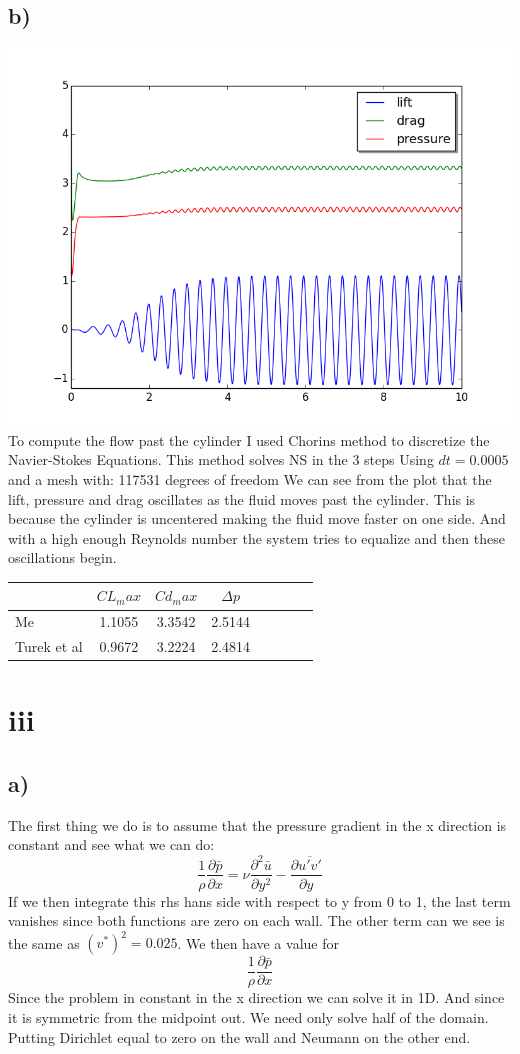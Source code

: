 \documentclass[a4paper,norsk]{article}
\begin{document}
\subsection*{b)}
\includegraphics[trim = 0mm 0mm 0mm 0mm, clip, scale=0.4]{lift_drag_pressure_plot.png} 
\newline
To compute the flow past the cylinder I used Chorins method to discretize the Navier-Stokes Equations. This method solves NS in the 3 steps
Using $dt = 0.0005 $ and a mesh with:  117531 degrees of freedom
We can see from the plot that the lift, pressure and drag oscillates as the fluid moves past the cylinder. This is because the cylinder is uncentered making the fluid move faster on one side. And with a high enough Reynolds number the system tries to equalize and then these oscillations begin.

\begin{tabular}{l*{6}{c}r}
 &$CL_max$  & $Cd_max   $ & $ \Delta p $   \\
\hline
Me & 1.1055 & 3.3542 & 2.5144 \\
Turek et al & 0.9672 & 3.2224 & 2.4814 \\
\end{tabular}

\section*{iii}
\subsection*{a)}
The first thing we do is to assume that the pressure gradient in the x direction is constant and see what we can do:
$$ \frac{1}{\rho} \frac{\partial \bar{p}}{\partial x} = \nu \frac{\partial^2 \bar{u}}{\partial y^2} - \frac{\partial \overline{u'v'}}{\partial y}    $$
If we then integrate this rhs hans side with respect to y from 0 to 1, the last term vanishes since both functions are zero on each wall.
The other term can we see is the same as $(v^*)^2 = 0.025$. We then have a value for $$ \frac{1}{\rho} \frac{\partial \bar{p}}{\partial x} $$
Since the problem in constant in the x direction we can solve it in 1D. And since it is symmetric from the midpoint out. We need only solve half of the domain. Putting Dirichlet equal to zero on the wall and Neumann on the other end.
\end{document}
